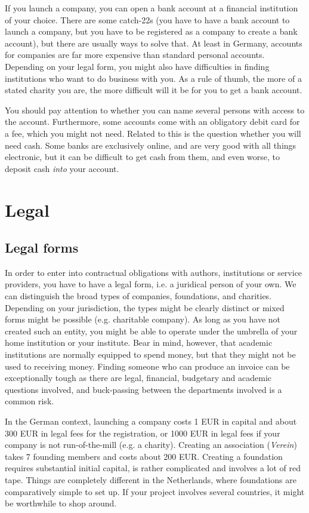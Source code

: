 \documentclass[guidelines,nonflat,modfonts] {langsci/langscibook}
\begin{document}
If you launch a company, you can open a bank account at a financial institution of your choice. There are some catch-22s (you have to have a bank account to launch a company, but you have to be registered as a company to create a bank account), but there are usually ways to solve that. At least in Germany, accounts for companies are far more expensive than standard personal accounts. Depending on your legal form, you might also have difficulties in finding institutions who want to do business with you. As a rule of thumb, the more of a stated charity you are, the more difficult will it be for you to get a bank account. 

You should pay attention to whether you can name several persons with access to the account. Furthermore, some accounts come with an obligatory debit card for a fee, which you might not need.
Related to this is the question whether you will need cash. Some banks are exclusively online, and are very good with all things electronic, but it can be difficult to get cash from them, and even worse, to deposit cash \textit{into} your account. 


\section{Legal}\label{sec:legal}
\subsection{Legal forms}\label{sec:legalform}
In order to enter into contractual obligations with authors, institutions or service providers, you have to have a legal form, i.e. a juridical person of your own. We can distinguish the broad types of companies, foundations, and charities. Depending on your jurisdiction, the types might be clearly distinct or mixed forms might be possible (e.g. charitable company). As long as you have not created such an entity, you might be able to operate under the umbrella of your home institution or your institute. Bear in mind, however, that academic institutions are normally equipped to spend money, but that they might not be used to receiving money. Finding someone who can produce an invoice can be exceptionally tough as there are legal, financial, budgetary and academic questions involved, and buck-passing between the departments involved is a common risk. 

In the German context, launching a company costs 1 EUR in capital and about 300 EUR in legal fees for the registration, or 1000 EUR in legal fees if your company is not run-of-the-mill (e.g. a charity). Creating an association (\textit{Verein}) takes 7 founding members and costs about 200 EUR. 
Creating a foundation requires substantial initial capital, is rather complicated and involves a lot of red tape. Things are completely different in the Netherlands, where foundations are comparatively simple to set up. If your project involves several countries, it might be worthwhile to shop around. 
\end{document}

